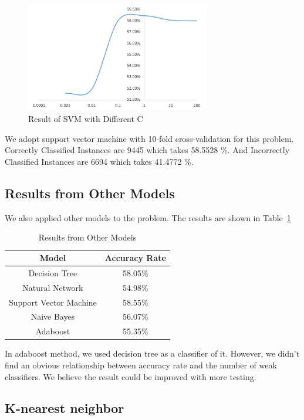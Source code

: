 \begin{figure}[!htbp]
\centering
\includegraphics[width=8.0cm]{svmcurve.PNG} 
\newline
\caption{Result of SVM with Different C}
\label{fig:svmcurve} 
\end{figure}


We adopt support vector machine with 10-fold cross-validation for this problem. Correctly Classified Instances are 9445 which takes 58.5528 \%. And Incorrectly Classified Instances are 6694 which takes 41.4772 \%. 


\subsection{Results from Other Models}
We also applied other models to the problem.
 The results are shown in Table~\ref{table:others}

\begin{table}
\begin{center}
\begin{tabular}{|c|c|}
\hline
Model & Accuracy Rate \\ \hline
Decision Tree & 58.05\% \\ \hline
Natural Network & 54.98\% \\ \hline
Support Vector Machine & 58.55\% \\ \hline
Naive Bayes & 56.07\% \\ \hline
Adaboost & 55.35\% \\ \hline
\end{tabular}
\caption{Results from Other Models}
\label{table:others}
\end{center}
\end{table}

In adaboost method, we used decision tree as a classifier of it. However, we didn't find an obvious relationship between accuracy rate and the number of weak classifiers. We believe the result could be improved with more testing.

\subsection{K-nearest neighbor}


